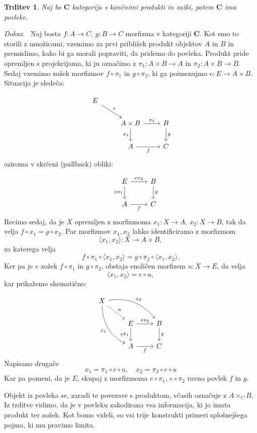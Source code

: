 \documentclass[12pt,a4paper]{book}
\theoremstyle{definition}
\theoremstyle{plain}
\newtheorem{trditev}[definicija]{Trditev}
\newenvironment{dokaz}{\emph{Dokaz.}\ }{\hspace{\fill}{$\Box$}}
\theoremstyle{definition}
\theoremstyle{remark}
\newcommand{\cat}[1]{\textbf{#1}}
\newcommand{\fprod}[1]{\langle #1 \rangle}
\begin{document}
\begin{trditev}
Naj bo $\cat{C}$ kategorija s končnimi produkti in zožki, potem $\cat{C}$ ima povleke.
\end{trditev}
\begin{dokaz}
Naj bosta $f : A \to C$, $g : B \to C$ morfizma v kategoriji $\cat{C}$. Kot smo to storili z množicami, vzemimo za prvi približek produkt objektov $A$ in $B$ in premislimo, kako bi ga morali popraviti, da pridemo do povleka. Produkt pride opremljen s projekcijama, ki ju označimo z $\pi_1 : A \times B \to A$ in $\pi_2 : A \times B \to B$. Sedaj vzemimo zožek morfizmov $f \circ \pi_1$ in $g \circ \pi_2$, ki ga poimenujmo $e : E \to A \times B$. Situacija je sledeča:

$$\begin{tikzcd}
E
\ar[dr, "e"] \\
& A \times B \arrow[r, "\pi_2"] \arrow[d, "\pi_1"']
& B \arrow[d, "g"] \\
& A \arrow[r, "f"']
& C
\end{tikzcd}$$
oziroma v skrčeni (pullback) obliki:

$$\begin{tikzcd}
& E \arrow[r, "e\pi_2"] \arrow[d, "e\pi_1"']
& B \arrow[d, "g"] \\
& A \arrow[r, "f"']
& C
\end{tikzcd}$$
Recimo sedaj, da je $X$ opremljen z morfizmoma $x_1 : X \to A$, $x_2 : X \to B$, tak da velja $f \circ x_1 = g \circ x_2$. Par morfizmov $x_1,x_2$ lahko identificiramo z morfizmom
$$\langle x_1,x_2 \rangle : X \to A \times B,$$
za katerega velja
$$f \circ \pi_1 \circ \fprod{x_1,x_2} = g \circ \pi_2 \circ \fprod{x_1,x_2}.$$
Ker pa je $e$ zožek $f \circ \pi_1$ in $g \circ \pi_2$, obstaja enoličen morfizem $u : X \to E$, da velja 
$$\fprod{x_1,x_2} = e \circ u,$$
kar prikažemo shematično:

$$\begin{tikzcd}
X \ar[ddr, bend right, "x_1"'] \ar[drr, bend left, "x_2"] \ar[dr, dashed, "u"] \\
& E \arrow[r, "e\pi_2"] \arrow[d, "e\pi_1"']
& B \arrow[d, "g"] \\
& A \arrow[r, "f"']
& C
\end{tikzcd}$$
%
Napisano drugače
$$x_1 = \pi_1 \circ e \circ u, \quad x_2 = \pi_2 \circ e \circ u$$
Kar pa pomeni, da je $E$, skupaj z morfizmoma $e \circ \pi_1$, $e \circ \pi_2$ ravno povlek $f$ in $g$.
\end{dokaz}

Objekt iz povleka se, zaradi te povezave s produktom, včasih označuje z $A \times_C B$.
Iz trditve vidimo, da je v povleku zakodirana vsa informacija, ki jo imata produkt ter zožek. Kot bomo videli, so vsi trije konstrukti primeri splošnejšega pojma, ki mu pravimo limita.
\end{document}
